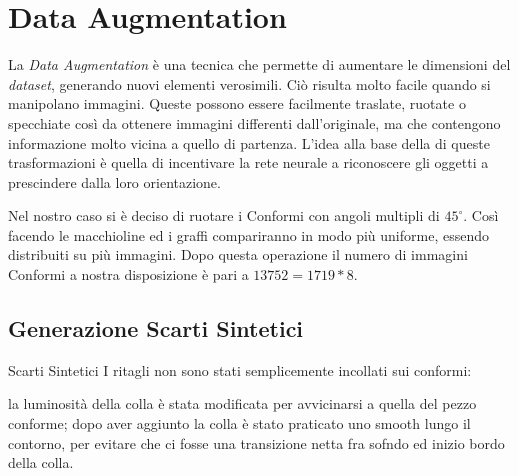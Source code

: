 
\clearpage
\section {Data Augmentation}
La \textit{Data Augmentation} è una tecnica che permette di aumentare le dimensioni del \textit{dataset}, generando nuovi elementi verosimili.
Ciò risulta molto facile quando si manipolano immagini.
Queste possono essere facilmente traslate, ruotate o specchiate così da ottenere immagini differenti dall'originale, ma che contengono informazione molto vicina a quello di partenza.
L'idea alla base della di queste trasformazioni è quella di incentivare la rete neurale a riconoscere gli oggetti a prescindere dalla loro orientazione.

Nel nostro caso si è deciso di ruotare i Conformi con angoli multipli di $45^\circ$.
Così facendo le macchioline ed i graffi compariranno in modo più uniforme, essendo distribuiti su più immagini.
Dopo questa operazione il numero di immagini Conformi a nostra disposizione è pari a $13752=1719*8$.

\subsection {Generazione Scarti Sintetici}
Scarti Sintetici
 I ritagli non sono stati semplicemente incollati sui conformi:

 la luminosità della colla è stata modificata per avvicinarsi a quella del pezzo conforme;
 dopo aver aggiunto la colla è stato praticato uno smooth lungo il contorno, per evitare che ci fosse una transizione netta fra sofndo ed inizio bordo della colla.





